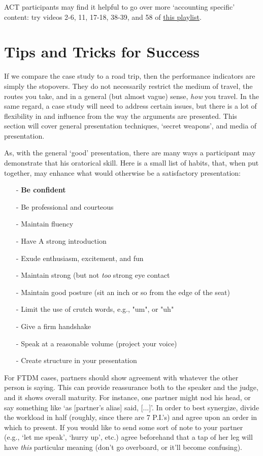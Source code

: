 \documentclass[12pt]{article}
\begin{document}
	ACT participants may find it helpful to go over more \lq accounting specific' content: try videos 2-6, 11, 17-18, 38-39, and 58 of \href{https://www.youtube.com/playlist?list=PL_PmoCeUoNMIX3zP2yYSAq8gi6irBVh-1}{this playlist}.



\section{Tips and Tricks for Success}

If we compare the case study to a road trip, then the performance indicators are simply the stopovers. They do not necessarily restrict the medium of travel, the routes you take, and in a general (but almost vague) sense, \textit{how} you travel. In the same regard, a case study will need to address certain issues, but there is a lot of flexibility in and influence from the way the arguments are presented. This section will cover general presentation techniques, \lq secret weapons', and media of presentation.

As, with the general \lq good' presentation, there are many ways a participant may demonstrate that his oratorical skill. Here is a small list of habits, that, when put together, may enhance what would otherwise be a satisfactory presentation:

\begin{itemize}
	\item[-] \textbf{Be confident}
	\item[-] Be professional and courteous
	\item[-] Maintain fluency
	\item[-] Have A strong introduction
	\item[-] Exude enthusiasm, excitement, and fun
	\item[-] Maintain strong (but not \textit{too} strong eye contact
	\item[-] Maintain good posture (sit an inch or so from the edge of the seat)
	\item[-] Limit the use of crutch words, e.g., "um", or "uh"
	\item[-] Give a firm handshake
	\item[-] Speak at a reasonable volume (project your voice)
	\item[-] Create structure in your presentation
\end{itemize}

For FTDM cases, partners should show agreement with whatever the other person is saying. This can provide reassurance both to the speaker and the judge, and it shows overall maturity. For instance, one partner might nod his head, or say something like \lq as [partner's alias] said, [...]'.  In order to best synergize, divide the workload in half (roughly, since there are 7 P.I.'s) and agree upon an order in which to present. If you would like to send some sort of note to your partner (e.g., \lq let me speak', \lq hurry up', etc.) agree beforehand that a tap of her leg will have \textit{this} particular meaning (don't go overboard, or it'll become confusing). \\
\end{document}
